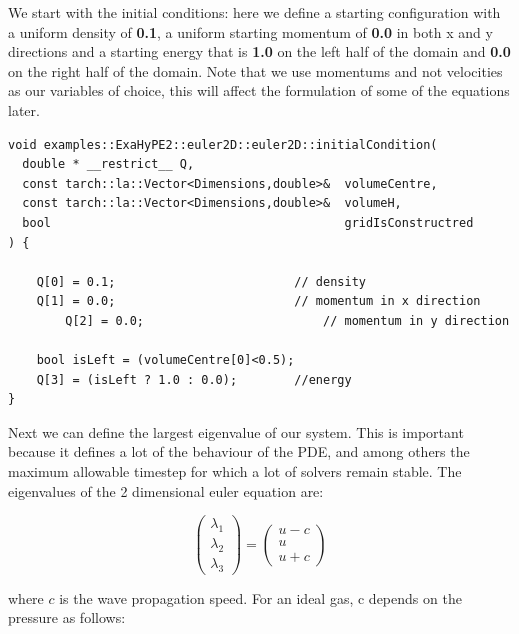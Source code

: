 \documentclass[12pt,letterpaper]{article}
\begin{document}
We start with the initial conditions: here we define a starting configuration with a uniform density of \textbf{0.1}, a uniform starting momentum of \textbf{0.0} in both x and y directions and a starting energy that is \textbf{1.0} on the left half of the domain and \textbf{0.0} on the right half of the domain. Note that we use momentums and not velocities as our variables of choice, this will affect the formulation of some of the equations later.\\

\begin{lstlisting}[style = C++]
void examples::ExaHyPE2::euler2D::euler2D::initialCondition(
  double * __restrict__ Q,
  const tarch::la::Vector<Dimensions,double>&  volumeCentre,
  const tarch::la::Vector<Dimensions,double>&  volumeH,
  bool                                         gridIsConstructred
) {

	Q[0] = 0.1;                         // density
	Q[1] = 0.0;                         // momentum in x direction
        Q[2] = 0.0;                         // momentum in y direction
  
	bool isLeft = (volumeCentre[0]<0.5);
	Q[3] = (isLeft ? 1.0 : 0.0);        //energy
}
\end{lstlisting}

\newpage

Next we can define the largest eigenvalue of our system. This is important because it defines a lot of the behaviour of the PDE, and among others the maximum allowable timestep for which a lot of solvers remain stable. The eigenvalues of the 2 dimensional euler equation are:

\begin{equation*}
    \left(
    \begin{array}{lr} \lambda_1 \\
                      \lambda_2 \\
                      \lambda_3
                      \end{array} \right) =
    \left(
    \begin{array}{lr} u - c \\
                      u \\
                      u + c
                      \end{array} \right)
\end{equation*}

where $c$ is the wave propagation speed. For an ideal gas, c depends on the pressure as follows:
\end{document}
